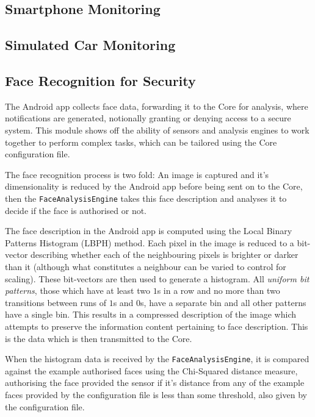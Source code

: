 \documentclass[10pt,a4paper]{article}
\begin{document}
\subsection{Smartphone Monitoring}

\subsection{Simulated Car Monitoring}

\subsection{Face Recognition for Security}
The Android app collects face data, forwarding it to the Core for analysis, where notifications are generated, notionally granting or denying access to a secure system. This module shows off the ability of sensors and analysis engines to work together to perform complex tasks, which can be tailored using the Core configuration file.

The face recognition process is two fold: An image is captured and it's dimensionality is reduced by the Android app before being sent on to the Core, then the \texttt{FaceAnalysisEngine} takes this face description and analyses it to decide if the face is authorised or not.

The face description in the Android app is computed using the Local Binary Patterns Histogram (LBPH) \cite{ahonen2006face} method. Each pixel in the image is reduced to a bit-vector describing whether each of the neighbouring pixels is brighter or darker than it (although what constitutes a neighbour can be varied to control for scaling). These bit-vectors are then used to generate a histogram. All \emph{uniform bit patterns}, those which have at least two $1$s in a row and no more than two transitions between runs of $1$s and $0$s, have a separate bin and all other patterns have a single bin. This results in a compressed description of the image which attempts to preserve the information content pertaining to face description. This is the data which is then transmitted to the Core.

When the histogram data is received by the \texttt{FaceAnalysisEngine}, it is compared against the example authorised faces using the Chi-Squared distance measure, authorising the face provided the sensor if it's distance from any of the example faces provided by the configuration file is less than some threshold, also given by the configuration file.
\end{document}
